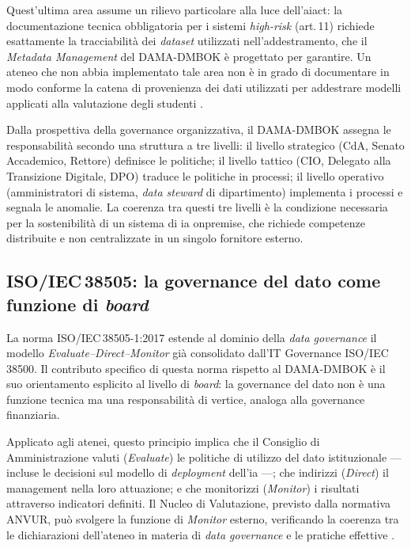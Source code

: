 Quest'ultima area assume un rilievo particolare alla luce dell'\gls{aiact}: la documentazione
tecnica obbligatoria per i sistemi \textit{high-risk} (art.\,11) richiede esattamente la
tracciabilità dei \textit{dataset} utilizzati nell'addestramento, che il \textit{Metadata
Management} del DAMA-DMBOK è progettato per garantire. Un ateneo che non abbia
implementato tale area non è in grado di documentare in modo conforme la catena di
provenienza dei dati utilizzati per addestrare modelli applicati alla valutazione degli
studenti \parencite{McNicol2024DataEthics}.

Dalla prospettiva della governance organizzativa, il DAMA-DMBOK assegna le responsabilità
secondo una struttura a tre livelli: il livello strategico (CdA, Senato
Accademico, Rettore) definisce le politiche; il livello tattico (CIO, Delegato
alla Transizione Digitale, DPO) traduce le politiche in processi; il livello
operativo (amministratori di sistema, \textit{data steward} di dipartimento)
implementa i processi e segnala le anomalie. La coerenza tra questi tre livelli è la
condizione necessaria per la sostenibilità di un sistema di \gls{ia} \gls{onpremise}, che
richiede competenze distribuite e non centralizzate in un singolo fornitore esterno.

\subsection{\texorpdfstring{ISO/IEC\,38505}{ISO/IEC 38505}: la governance del dato come funzione di \textit{board}}

La norma ISO/IEC\,38505-1:2017 \parencite{ISO38505} estende al dominio della
\textit{data governance} il modello \textit{Evaluate--Direct--Monitor} già consolidato
dall'IT Governance ISO/IEC\,38500. Il contributo specifico di questa norma rispetto al
DAMA-DMBOK è il suo orientamento esplicito al livello di \textit{board}: la
governance del dato non è una funzione tecnica ma una responsabilità di vertice, analoga
alla governance finanziaria.

Applicato agli atenei, questo principio implica che il Consiglio di Amministrazione
valuti (\textit{Evaluate}) le politiche di utilizzo del dato istituzionale --- incluse le
decisioni sul modello di \textit{deployment} dell'\gls{ia} ---; che indirizzi (\textit{Direct})
il management nella loro attuazione; e che monitorizzi (\textit{Monitor}) i risultati
attraverso indicatori definiti. Il Nucleo di Valutazione, previsto dalla normativa
ANVUR, può svolgere la funzione di \textit{Monitor} esterno, verificando la coerenza tra
le dichiarazioni dell'ateneo in materia di \textit{data governance} e le pratiche
effettive \parencite{ISO38505}.

